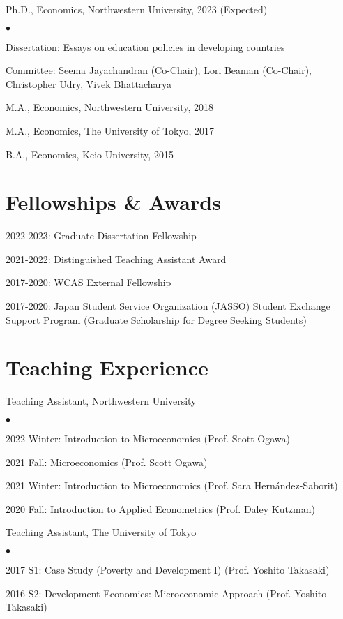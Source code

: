 \documentclass[margin,line]{res}
\newenvironment{list1}{
  \begin{list}{\ding{113}}{%
      \setlength{\itemsep}{.025in}
      \setlength{\parsep}{0in} \setlength{\parskip}{0in}
      \setlength{\topsep}{0in} \setlength{\partopsep}{0in}
      \setlength{\leftmargin}{0.17in}}}{\end{list}}
\newenvironment{list2}{
  \begin{list}{$\bullet$}{%
      \setlength{\itemsep}{0in}
      \setlength{\parsep}{0in} \setlength{\parskip}{0in}
      \setlength{\topsep}{0in} \setlength{\partopsep}{0in}
      \setlength{\leftmargin}{0.2in}}}{\end{list}}
\begin{document}
\begin{resume}
\begin{tiny}
\end{tiny}
\begin{list1}
\item[] Ph.D., Economics, Northwestern University, 2023 (Expected)
	\begin{list2}
		\item[] Dissertation: Essays on education policies in developing countries
		\item[] Committee: Seema Jayachandran (Co-Chair), Lori Beaman (Co-Chair), Christopher Udry, Vivek Bhattacharya
	\end{list2}
\item[] M.A., Economics, Northwestern University, 2018
\item[] M.A., Economics, The University of Tokyo, 2017
\item[] B.A., Economics, Keio University, 2015
\end{list1}

\section{Fellowships \& Awards}
\begin{list1}
\item[] 2022-2023: Graduate Dissertation Fellowship
\item[] 2021-2022: Distinguished Teaching Assistant Award
\item[] 2017-2020: WCAS External Fellowship
\item[] 2017-2020: Japan Student Service Organization (JASSO) Student Exchange Support Program (Graduate Scholarship for Degree Seeking Students)
\end{list1}

\section{Teaching Experience}
\begin{list1}
\item[] Teaching Assistant, Northwestern University
	\begin{list2}
		\item[] 2022 Winter: Introduction to Microeconomics (Prof. Scott Ogawa)
		\item[] 2021 Fall: Microeconomics (Prof. Scott Ogawa)
		\item[] 2021 Winter: Introduction to Microeconomics (Prof. Sara Hernández-Saborit)
		\item[] 2020 Fall: Introduction to Applied Econometrics (Prof. Daley Kutzman)
	\end{list2}
\item[] Teaching Assistant, The University of Tokyo
	\begin{list2}
		\item[] 2017 S1: Case Study (Poverty and Development I) (Prof. Yoshito Takasaki)
		\item[] 2016 S2: Development Economics: Microeconomic Approach (Prof. Yoshito Takasaki)
	\end{list2}
\end{list1}


\end{resume}
\end{document}
